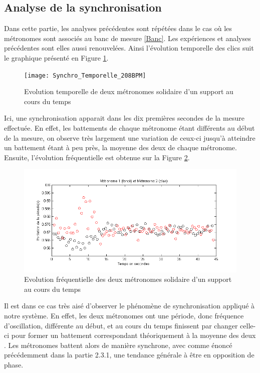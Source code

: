 \documentclass[a4paper,11pt]{report}
\begin{document}
\subsection{Analyse de la synchronisation}
Dans cette partie, les analyses précédentes sont répétées dans le cas où les métronomes sont associés au banc de mesure \ref{Banc}. Les expériences et analyses précédentes sont elles aussi renouvelées. Ainsi l'évolution temporelle des clics suit le graphique présenté en Figure \ref{SynchronisationT}.
\begin{figure}[h]
\centering
\texttt{[image: Synchro\_Temporelle\_208BPM]}
\caption{Evolution temporelle de deux métronomes solidaire d'un support au cours du temps}\label{SynchronisationT}
\end{figure}
Ici, une synchronisation apparait dans les dix premières secondes de la mesure effectuée. En effet, les battements de chaque métronome étant différents au début de la mesure, on observe très largement une variation de ceux-ci jusqu'à atteindre un battement étant à peu près, la moyenne des deux de chaque métronome. Ensuite, l'évolution fréquentielle est obtenue sur la Figure \ref{SynchronisationF}.
\begin{figure}[!h]
\centering
\includegraphics[width=1\textwidth]{Synchro_Frequence_208BPM}
\caption{Evolution fréquentielle des deux métronomes solidaire d'un support au cours du temps}\label{SynchronisationF}
\end{figure}
Il est dans ce cas très aisé d'observer le phénomène de synchronisation appliqué à notre système. En effet, les deux métronomes ont une période, donc fréquence d'oscillation, différente au début, et au cours du temps finissent par changer celle-ci pour former un battement correspondant théoriquement à la moyenne des deux \cite{piko}. Les métronomes battent alors de manière synchrone, avec comme énoncé précédemment dans la partie 2.3.1, une tendance générale à être en opposition de phase.
\end{document}
